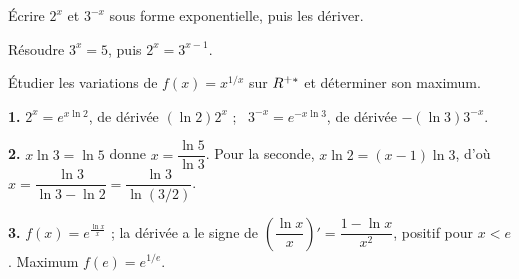 \begin{entrainement}
\exo[\niveau{1}] Écrire $2^{x}$ et $3^{-x}$ sous forme exponentielle, puis les
dériver.

\exo[\niveau{2}] Résoudre $3^{x} = 5$, puis $2^{x} = 3^{x-1}$.

\exo[\niveau{3}] Étudier les variations de $f(x) = x^{1/x}$ sur $R^{+*}$ et
déterminer son maximum.
\end{entrainement}

\begin{corrige}
\textbf{1.} $2^{x} = e^{x\ln 2}$, de dérivée $(\ln 2)2^{x}$ ; \
$3^{-x} = e^{-x\ln 3}$, de dérivée $-(\ln 3)3^{-x}$.

\textbf{2.} $x\ln 3 = \ln 5$ donne $x = \dfrac{\ln 5}{\ln 3}$. Pour la seconde,
$x\ln 2 = (x-1)\ln 3$, d'où $x = \dfrac{\ln 3}{\ln 3 - \ln 2} = \dfrac{\ln3}{\ln(3/2)}$.

\textbf{3.} $f(x) = e^{\frac{\ln x}{x}}$ ; la dérivée a le signe de
$\left(\dfrac{\ln x}{x}\right)' = \dfrac{1-\ln x}{x^{2}}$, positif pour $x<e$.
Maximum $f(e) = e^{1/e}$.
\end{corrige}


